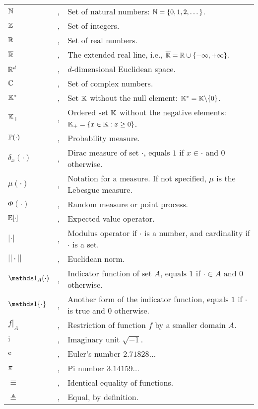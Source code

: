 \begin{center}
\end{center}
\vspace{1cm}

\noindent
\begin{tabular}{l c l}
    $\N$        & \sep & Set of natural numbers: $\N = \{0,1,2,\dots\}$.\\
    $\Z$        & \sep & Set of integers.\\
    $\R$        & \sep & Set of real numbers.\\
    $\overline\R$   & \sep & The extended real line, i.e., $\overline\R = \R\cup\{-\infty,+\infty\}$.\\
    $\R^d$      & \sep & $d$-dimensional Euclidean space.\\
    $\C$        & \sep & Set of complex numbers.\\
    $\K^*$      & \sep & Set $\K$ without the null element: $\K^* = \K\backslash\{0\}$.\\
    $\K_+$      & \sep & Ordered set $\K$ without the negative elements: $\K_+ = \{x \in \K : x \ge 0\}$.\\
    $\P(\cdot)$        & \sep & Probability measure.\\
    $\delta_x(\cdot)$  & \sep & Dirac measure of set $\cdot$, equals $1$ if $x\in\cdot$ and $0$ otherwise.\\
    $\mu(\cdot)$       & \sep & Notation for a measure. If not specified, $\mu$ is the Lebesgue measure.\\
    $\Phi(\cdot)$      & \sep & Random measure or point process.\\
    $\E[\cdot]$ & \sep & Expected value operator.\\
    $|\cdot|$   & \sep & Modulus operator if $\cdot$ is a number, and cardinality if $\cdot$ is a set.\\
    $||\cdot||$ & \sep & Euclidean norm.\\
    $\ind_{A}(\cdot)$  & \sep & Indicator function of set $A$, equals $1$ if $\cdot\in A$ and $0$ otherwise.\\
    $\ind\!\left\{\cdot\right\}$  & \sep & Another form of the indicator function, equals $1$ if $\cdot$ is true and $0$ otherwise.\\
    $f\vert_A$      & \sep & Restriction of function $f$ by a smaller domain $A$.\\
    $\iu$       & \sep & Imaginary unit $\sqrt{-1}$.\\
    $\euler$    & \sep & Euler's number $2.71828\dots$\\
    $\pi$       & \sep & Pi number $3.14159\dots$\\
    $\equiv$    & \sep & Identical equality of functions.\\
    $\triangleq$ & \sep & Equal, by definition.\\
\end{tabular}
\cleardoublepage


